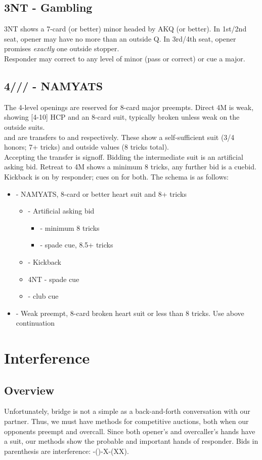 \documentclass[12pt]{report}
\newcommand{\n}{\\}
\newcommand{\ul}[1]{\begin{itemize}#1\end{itemize}}
\newcommand{\li}{\item[~]}
\newcommand{\bidsection}[2]{\section{\texorpdfstring{#1}{#2}}}
\begin{document}
\bidsection{3NT - Gambling}{3NT - Gambling} \label{2:11}

    3NT shows a 7-card (or better) minor headed by AKQ (or better).  In 1st/2nd seat, opener may have no more than an outside Q.  In 3rd/4th seat, opener promises \textit{exactly} one outside stopper.\n

    Responder may correct to any level of minor (pass or correct) or cue a major.

\bidsection{4\cl{}/\di{}/\he{}/\sp{} - NAMYATS}{4♣/♢/♡/♠ - NAMYATS} \label{2:12}

    The 4-level openings are reserved for 8-card major preempts.  Direct 4M is weak, showing [4-10] HCP and an 8-card suit, typically broken unless weak on the outside suits.\n

     and  are transfers to  and  respectively.  These show a self-sufficient suit (3/4 honors; 7+ tricks) and outside values (8 tricks total).\n

    Accepting the transfer is signoff.  Bidding the intermediate suit is an artificial asking bid.  Retreat to 4M shows a minimum 8 tricks, any further bid is a cuebid.\n

    Kickback is on by responder; cues on for both.  The schema is as follows:

    \ul {
        \li {} - NAMYATS, 8-card or better heart suit and 8+ tricks
        \ul {
            \li \di4 - Artificial asking bid
            \ul {
                \li \he4 - minimum 8 tricks
                \li \sp4 - spade cue, 8.5+ tricks
            }
            \li \sp4 - Kickback
            \li 4NT - spade cue
            \li \cl5 - club cue
        }
        \li \he4 - Weak preempt, 8-card broken heart suit or less than 8 tricks.  Use above continuation
    }

\chapter{Interference}
\section{Overview} \label{3:1}

Unfortunately, bridge is not a simple as a back-and-forth conversation with our partner.  Thus, we must have methods for competitive auctions, both when our opponents preempt and overcall.  Since both opener's and overcaller's hands have a suit, our methods show the probable and important hands of responder.  Bids in parenthesis are interference: -()-X-(XX). \n
\end{document}
